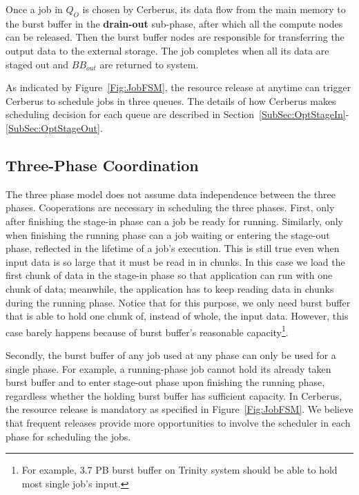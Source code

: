 Once a job in $Q_O$ is chosen by Cerberus, its data flow from the main memory to the burst buffer
in the \textbf{drain-out} sub-phase, after which all the compute nodes can be released.
Then the burst buffer nodes are responsible for transferring the output data to the external storage.
The job completes when all its data are staged out and $BB_{out}$ are returned to system.

As indicated by Figure~\ref{Fig:JobFSM}, the resource release at anytime can trigger Cerberus
to schedule jobs in three queues.
The details of how Cerberus makes scheduling decision for each queue are
described in Section~\ref{SubSec:OptStageIn}-\ref{SubSec:OptStageOut}.

\subsection{Three-Phase Coordination}
\label{SubSet:Coordination}
The three phase model does not assume data independence between the three phases.
Cooperations are necessary in scheduling the three phases.
First, only after finishing the stage-in phase can a job be ready for running.
Similarly, only when finishing the running phase can a job waiting or entering the stage-out phase,
reflected in the lifetime of a job's execution.
This is still true even when input data is so large that it must be read in in chunks.
In this case we load the first chunk of data in the stage-in phase so that application
can run with one chunk of data;
meanwhile, the application has to keep reading data in chunks during the running phase.
Notice that for this purpose, we only need burst buffer that is able to hold one chunk
of, instead of whole, the input data.
However, this case barely happens because of burst buffer's reasonable capacity\footnote{For
example, 3.7 PB burst buffer on Trinity system should be able to hold most single job's input.}.

Secondly, the burst buffer of any job used at any phase can only be used for a single phase.
For example, a running-phase job cannot hold its already taken burst buffer
and to enter stage-out phase upon finishing the running phase,
regardless whether the holding burst buffer has sufficient capacity.
In Cerberus, the resource release is mandatory as specified in Figure~\ref{Fig:JobFSM}.
We believe that frequent releases provide more opportunities to involve the scheduler in each phase for scheduling the jobs.

